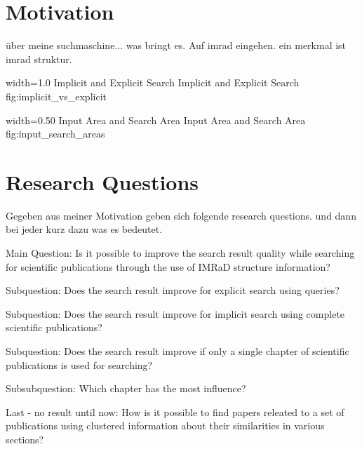 \section{Motivation}
\label{sec:Motivation}

über meine suchmaschine... was bringt es. Auf imrad eingehen. ein merkmal ist imrad struktur.

      {width=1.0\textwidth}
      {Implicit and Explicit Search}
      {Implicit and Explicit Search}
      {fig:implicit_vs_explicit}

      {width=0.50\textwidth}
      {Input Area and Search Area}
      {Input Area and Search Area}
      {fig:input_search_areas}


\section{Research Questions}
\label{sec:research_questions}

Gegeben aus meiner Motivation geben sich folgende research questions. und dann bei jeder kurz dazu was es bedeutet.


Main Question: Is it possible to improve the search result quality while searching for scientific publications through the use of IMRaD structure information?

Subquestion: Does the search result improve for explicit search using queries?

Subquestion: Does the search result improve for implicit search using complete scientific publications?

Subquestion: Does the search result improve if only a single chapter of scientific publications is used for searching?

Subsubquestion: Which chapter has the most influence?

Last - no result until now: How is it possible to find papers releated to a set of publications using clustered information about their similarities in various sections?
